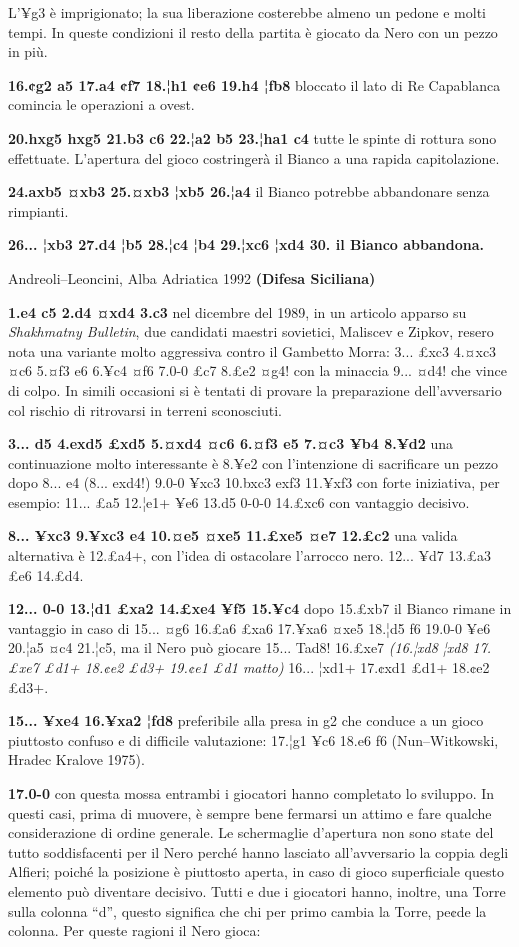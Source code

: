 \documentclass[
]{article}
\begin{document}
L'¥g3 è imprigionato; la sua liberazione costerebbe almeno un pedone e
molti tempi. In queste condizioni il resto della partita è giocato da
Nero con un pezzo in più.

\textbf{16.¢g2 a5 17.a4 ¢f7 18.¦h1 ¢e6 19.h4 ¦fb8} bloccato il lato di
Re Capablanca comincia le operazioni a ovest.

\textbf{20.hxg5 hxg5 21.b3 c6 22.¦a2 b5 23.¦ha1 c4} tutte le spinte di
rottura sono effettuate. L'apertura del gioco costringerà il Bianco a
una rapida capitolazione.

\textbf{24.axb5 ¤xb3 25.¤xb3 ¦xb5 26.¦a4} il Bianco potrebbe abbandonare
senza rimpianti.

\textbf{26... ¦xb3 27.d4 ¦b5 28.¦c4 ¦b4 29.¦xc6 ¦xd4 30. il Bianco
abbandona.}

Andreoli--Leoncini, Alba Adriatica 1992 \textbf{(Difesa Siciliana)}

\textbf{1.e4 c5 2.d4 ¤xd4 3.c3} nel dicembre del 1989, in un articolo
apparso su \emph{Shakhmatny Bulletin}, due candidati maestri sovietici,
Maliscev e Zipkov, resero nota una variante molto aggressiva contro il
Gambetto Morra: 3... £xc3 4.¤xc3 ¤c6 5.¤f3 e6 6.¥c4 ¤f6 7.0-0 £c7 8.£e2
¤g4! con la minaccia 9... ¤d4! che vince di colpo. In simili occasioni
si è tentati di provare la preparazione dell'avversario col rischio di
ritrovarsi in terreni sconosciuti.

\textbf{3... d5 4.exd5 £xd5 5.¤xd4 ¤c6 6.¤f3 e5 7.¤c3 ¥b4 8.¥d2} una
continuazione molto interessante è 8.¥e2 con l'intenzione di sacrificare
un pezzo dopo 8... e4 (8... exd4!) 9.0-0 ¥xc3 10.bxc3 exf3 11.¥xf3 con
forte iniziativa, per esempio: 11... £a5 12.¦e1+ ¥e6 13.d5 0-0-0 14.£xc6
con vantaggio decisivo.

\textbf{8... ¥xc3 9.¥xc3 e4 10.¤e5 ¤xe5 11.£xe5 ¤e7 12.£c2} una valida
alternativa è 12.£a4+, con l'idea di ostacolare l'arrocco nero. 12...
¥d7 13.£a3 £e6 14.£d4.

\textbf{12... 0-0 13.¦d1 £xa2 14.£xe4 ¥f5 15.¥c4} dopo 15.£xb7 il Bianco
rimane in vantaggio in caso di 15... ¤g6 16.£a6 £xa6 17.¥xa6 ¤xe5 18.¦d5
f6 19.0-0 ¥e6 20.¦a5 ¤c4 21.¦c5, ma il Nero può giocare 15... Tad8!
16.£xe7 \emph{(16.¦xd8 ¦xd8 17.£xe7 £d1+ 18.¢e2 £d3+ 19.¢e1 £d1 matto)}
16... ¦xd1+ 17.¢xd1 £d1+ 18.¢e2 £d3+.

\textbf{15... ¥xe4 16.¥xa2 ¦fd8} preferibile alla presa in g2 che
conduce a un gioco piuttosto confuso e di difficile valutazione: 17.¦g1
¥c6 18.e6 f6 (Nun--Witkowski, Hradec Kralove 1975).

\textbf{17.0-0} con questa mossa entrambi i giocatori hanno completato
lo sviluppo. In questi casi, prima di muovere, è sempre bene fermarsi un
attimo e fare qualche considerazione di ordine generale. Le schermaglie
d'apertura non sono state del tutto soddisfacenti per il Nero perché
hanno lasciato all'avversario la coppia degli Alfieri; poiché la
posizione è piuttosto aperta, in caso di gioco superficiale questo
elemento può diventare decisivo. Tutti e due i giocatori hanno, inoltre,
una Torre sulla colonna ``d'', questo significa che chi per primo cambia
la Torre, pe¢de la colonna. Per queste ragioni il Nero gioca:
\end{document}
